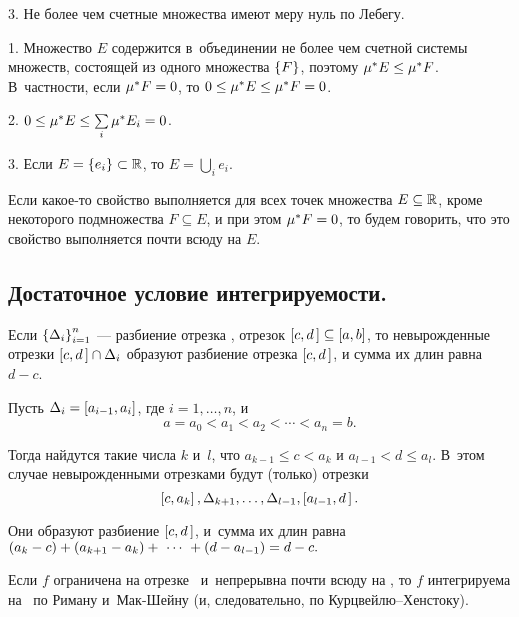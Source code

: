 \documentclass[draft]{article}
\begin{document}
3. Не более чем счетные множества имеют меру нуль по Лебегу.

\prs

\smallskip

1. Множество $E$ содержится в~объединении не более чем счетной
системы множеств, состоящей из одного множества $\left\{F\right\}$, поэтому
$\mu^*{E}\le\mu^*{F}$. В~частности, если $\mu^*{F}=0$, то
$0\le\mu^*{E}\le\mu^*{F}=0$.

\smallskip

2. $0\le\mu^*{E}\le\sum\limits_i\mu^*{E_i}=0$.

3. Если $E=\left\{e_i\right\}\subset\mathbb{R}$, то $E=\bigcup\limits_i{e_i}$.

\pruts

\bigskip

\df Если какое-то свойство выполняется для всех точек множества
$E\subseteq\mathbb{R}$, кроме некоторого подмножества $F\subseteq E$, и
при этом $\mu^*{F}=0$, то будем говорить, что это свойство
выполняется почти всюду на $E$.


\subsection{Достаточное условие интегрируемости.}

\lm

Если $\left\{\Delta_i\right\}_{i=1}^n$ --- разбиение отрезка \ab, отрезок
$\seg[c,d\,]\subseteq\segab$, то невырожденные отрезки
$\seg[c,d\,]\cap\dei$ образуют разбиение отрезка $\seg[c,d\,]$, и
сумма их длин равна $d-c$.

\pr

Пусть $\dei=\seg[a_{i-1},a_i]$, где $i=1,\dots,n$, и
$$a=a_0<a_1<a_2<\cdots<a_n=b.$$

Тогда найдутся такие числа $k$ и~$l$, что $a_{k-1}\le c<a_k$ и
$a_{l-1}<d\le a_l$. В~этом случае невырожденными отрезками будут
(только) отрезки
$$\seg[c,a_k],\Delta_{k+1},\dots,\Delta_{l-1},\seg[a_{l-1},d\,].$$

Они образуют разбиение $\seg[c,d\,]$, и~сумма их длин равна\
$\at(a_k-c)+\at(a_{k+1}-a_k)+\ \cdots\ +\at(d-a_{l-1})=d-c.$

\prlm

\eject


Если $f$ ограничена на отрезке \ab\ и~непрерывна почти всюду на \ab,
то $f$ интегрируема на  \ab\ по Риману и~Мак-Шейну (и,
следовательно, по Курцвейлю--Хенстоку).

\pr
\end{document}
